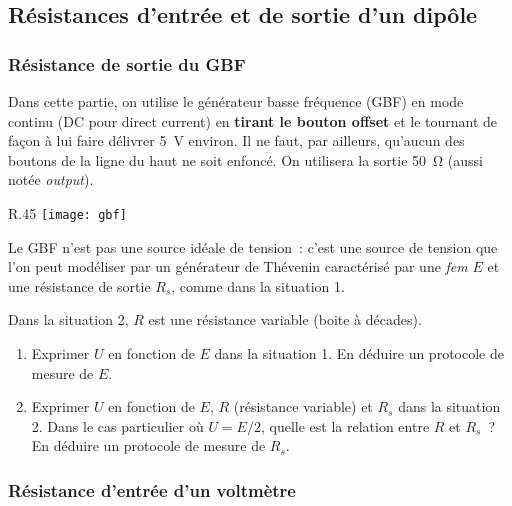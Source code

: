 \documentclass[a4paper, 11pt, final, garamond]{book}
\begin{document}
\subsection{Résistances d'entrée et de sortie d'un dipôle}
\subsubsection{Résistance de sortie du GBF}

Dans cette partie, on utilise le générateur basse fréquence (GBF) en mode
continu (DC pour direct current) en \textbf{tirant le bouton offset} et le
tournant de façon à lui faire délivrer \SI{5}{V} environ. Il ne faut, par
ailleurs, qu’aucun des boutons de la ligne du haut ne soit enfoncé. On utilisera
la sortie \SI{50}{\ohm} (aussi notée \textit{output}).\bigbreak

\begin{wrapfigure}[11]{R}{.45\linewidth}
    \centering
    \texttt{[image: gbf]}
\end{wrapfigure}
Le GBF n’est pas une source idéale de tension~: c’est une source de tension que
l’on peut modéliser par un générateur de Thévenin caractérisé par une
\textit{fem} $E$ et une résistance de sortie $R_s$, comme dans la situation 1.

Dans la situation 2, $R$ est une résistance variable (boite à décades).
\begin{enumerate}
    \item Exprimer $U$ en fonction de $E$ dans la situation 1. En déduire un
        protocole de mesure de $E$.
    \item Exprimer $U$ en fonction de $E$, $R$ (résistance variable) et $R_s$
        dans la situation 2. Dans le cas particulier où $U=E/2$, quelle est la
        relation entre  $R$ et $R_s$~? En déduire un protocole de mesure de
        $R_s$.
\end{enumerate}

\subsubsection{Résistance d'entrée d'un voltmètre}
\end{document}
